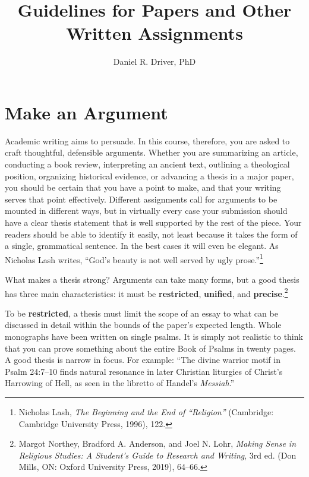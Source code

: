 \documentclass[11pt]{article}
\title{Guidelines for Papers and Other Written Assignments}
\author{Daniel R. Driver, PhD}
\date{}
\begin{document}
\maketitle

\section{Make an Argument}

Academic writing aims to persuade. In this course, therefore, you are
asked to craft thoughtful, defensible arguments. Whether you are
summarizing an article, conducting a book review, interpreting an
ancient text, outlining a theological position, organizing historical
evidence, or advancing a thesis in a major paper, you should be certain
that you have a point to make, and that your writing serves that point
effectively. Different assignments call for arguments to be mounted in
different ways, but in virtually every case your submission should have
a clear thesis statement that is well supported by the rest of the
piece. Your readers should be able to identify it easily, not least
because it takes the form of a single, grammatical sentence. In the best
cases it will even be elegant. As Nicholas Lash writes, “God’s beauty is
not well served by ugly prose.”\footnote{Nicholas Lash, \emph{The
Beginning and the End of “Religion”} (Cambridge: Cambridge University
Press, 1996), 122.}

What makes a thesis strong? Arguments can take many forms, but a good
thesis has three main characteristics: it must be \textbf{restricted},
\textbf{unified}, and \textbf{precise}.\footnote{Margot Northey,
Bradford A. Anderson, and Joel N. Lohr, \emph{Making Sense in Religious
Studies: A Student's Guide to Research and Writing}, 3rd ed. (Don Mills,
ON: Oxford University Press, 2019), 64–66.}

To be \textbf{restricted}, a thesis must limit the scope of an essay to
what can be discussed in detail within the bounds of the paper's
expected length. Whole monographs have been written on single psalms. It
is simply not realistic to think that you can prove something about the
entire Book of Psalms in twenty pages. A good thesis is narrow in focus.
For example: “The divine warrior motif in Psalm 24:7–10 finds natural
resonance in later Christian liturgies of Christ's Harrowing of Hell, as
seen in the libretto of Handel's \emph{Messiah}.”
\end{document}
